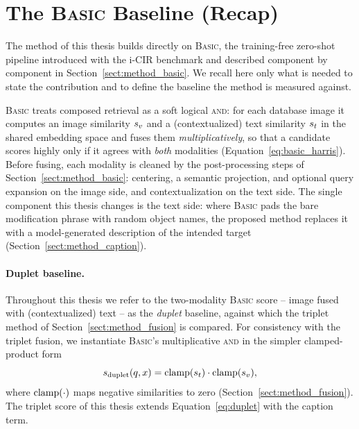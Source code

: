 \section{The \textsc{Basic} Baseline (Recap)}\label{sect:method_basic_recap}

The method of this thesis builds directly on \textsc{Basic}, the training-free
zero-shot pipeline introduced with the i-CIR benchmark and described component by
component in Section~\ref{sect:method_basic}. We recall here only what is needed
to state the contribution and to define the baseline the method is measured
against.

\textsc{Basic} treats composed retrieval as a soft logical \textsc{and}: for each
database image it computes an image similarity $s_{v}$ and a (contextualized) text
similarity $s_{t}$ in the shared embedding space and fuses them
\emph{multiplicatively}, so that a candidate scores highly only if it agrees with
\emph{both} modalities (Equation~\eqref{eq:basic_harris}). Before fusing, each
modality is cleaned by the post-processing steps of
Section~\ref{sect:method_basic}: centering, a semantic projection, and optional
query expansion on the image side, and contextualization on the text side. The
single component this thesis changes is the text side: where \textsc{Basic} pads
the bare modification phrase with random object names, the proposed method
replaces it with a model-generated description of the intended target
(Section~\ref{sect:method_caption}).

\paragraph{Duplet baseline.} Throughout this thesis we refer to the two-modality
\textsc{Basic} score -- image fused with (contextualized) text -- as the
\emph{duplet} baseline, against which the triplet method of
Section~\ref{sect:method_fusion} is compared. For consistency with the triplet
fusion, we instantiate \textsc{Basic}'s multiplicative \textsc{and} in the simpler
clamped-product form
\begin{equation}\label{eq:duplet}
    s_{\text{duplet}}(q, x) =
    \mathrm{clamp}(s_{t})\cdot\mathrm{clamp}(s_{v}),
\end{equation}
where $\mathrm{clamp}(\cdot)$ maps negative similarities to zero
(Section~\ref{sect:method_fusion}). The triplet score of this thesis extends
Equation~\eqref{eq:duplet} with the caption term.

